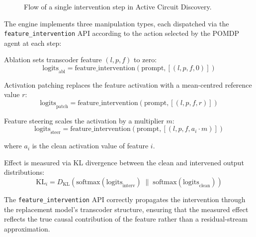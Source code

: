 \begin{figure}[H]
\centering
\resizebox{!}{0.82\textheight}{%
%
}
\caption{Flow of a single intervention step in Active Circuit Discovery.}
\label{fig:flow}
\end{figure}

The engine implements three manipulation types, each dispatched
via the \texttt{feature\_in\-ter\-ven\-tion} API according to the
action selected by the POMDP agent at each step:

Ablation sets transcoder feature $(l, p, f)$ to zero:
\begin{equation}
  \label{eq:ablation}
  \text{logits}_{\text{abl}} = \text{feature\_intervention}(\text{prompt},
  [(l, p, f, 0)])
\end{equation}

Activation patching replaces the feature activation with a
mean-centred reference value $r$:
\begin{equation}
  \label{eq:patching}
  \text{logits}_{\text{patch}} = \text{feature\_intervention}(\text{prompt},
  [(l, p, f, r)])
\end{equation}

Feature steering scales the activation by a multiplier $m$:
\begin{equation}
  \label{eq:steering}
  \text{logits}_{\text{steer}} = \text{feature\_intervention}(\text{prompt},
  [(l, p, f, a_i \cdot m)])
\end{equation}

where $a_i$ is the clean activation value of feature $i$.

Effect is measured via KL divergence between the clean and intervened
output distributions:
\begin{equation}
  \label{eq:kl_intervention}
  \text{KL}_i = D_{\text{KL}}\!\left(
    \text{softmax}(\text{logits}_{\text{interv}})
    \;\|\;
    \text{softmax}(\text{logits}_{\text{clean}})
  \right)
\end{equation}

The \texttt{feature\_intervention} API correctly propagates the
intervention through the replacement model's transcoder structure,
ensuring that the measured effect reflects the true causal contribution
of the feature rather than a residual-stream approximation.
